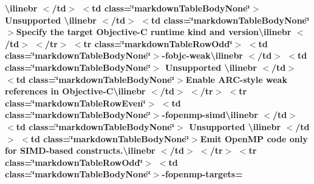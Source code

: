 \begin{longtabu}
{\bfseries{{\ttfamily \textbackslash{}ilinebr \texorpdfstring{$<$}{<}/td\texorpdfstring{$>$}{>} \texorpdfstring{$<$}{<}td class=\char`\"{}markdown\+Table\+Body\+None\char`\"{}\texorpdfstring{$>$}{>} Unsupported \textbackslash{}ilinebr \texorpdfstring{$<$}{<}/td\texorpdfstring{$>$}{>} \texorpdfstring{$<$}{<}td class=\char`\"{}markdown\+Table\+Body\+None\char`\"{}\texorpdfstring{$>$}{>}}Specify the target Objective-\/C runtime kind and version{\ttfamily \textbackslash{}ilinebr \texorpdfstring{$<$}{<}/td\texorpdfstring{$>$}{>} \texorpdfstring{$<$}{<}/tr\texorpdfstring{$>$}{>} \texorpdfstring{$<$}{<}tr class=\char`\"{}markdown\+Table\+Row\+Odd\char`\"{}\texorpdfstring{$>$}{>} \texorpdfstring{$<$}{<}td class=\char`\"{}markdown\+Table\+Body\+None\char`\"{}\texorpdfstring{$>$}{>}}-\/fobjc-\/weak{\ttfamily \textbackslash{}ilinebr \texorpdfstring{$<$}{<}/td\texorpdfstring{$>$}{>} \texorpdfstring{$<$}{<}td class=\char`\"{}markdown\+Table\+Body\+None\char`\"{}\texorpdfstring{$>$}{>} Unsupported \textbackslash{}ilinebr \texorpdfstring{$<$}{<}/td\texorpdfstring{$>$}{>} \texorpdfstring{$<$}{<}td class=\char`\"{}markdown\+Table\+Body\+None\char`\"{}\texorpdfstring{$>$}{>}}Enable ARC-\/style weak references in Objective-\/C{\ttfamily \textbackslash{}ilinebr \texorpdfstring{$<$}{<}/td\texorpdfstring{$>$}{>} \texorpdfstring{$<$}{<}/tr\texorpdfstring{$>$}{>} \texorpdfstring{$<$}{<}tr class=\char`\"{}markdown\+Table\+Row\+Even\char`\"{}\texorpdfstring{$>$}{>} \texorpdfstring{$<$}{<}td class=\char`\"{}markdown\+Table\+Body\+None\char`\"{}\texorpdfstring{$>$}{>}}-\/fopenmp-\/simd{\ttfamily \textbackslash{}ilinebr \texorpdfstring{$<$}{<}/td\texorpdfstring{$>$}{>} \texorpdfstring{$<$}{<}td class=\char`\"{}markdown\+Table\+Body\+None\char`\"{}\texorpdfstring{$>$}{>} Unsupported \textbackslash{}ilinebr \texorpdfstring{$<$}{<}/td\texorpdfstring{$>$}{>} \texorpdfstring{$<$}{<}td class=\char`\"{}markdown\+Table\+Body\+None\char`\"{}\texorpdfstring{$>$}{>}}Emit Open\+MP code only for SIMD-\/based constructs.{\ttfamily \textbackslash{}ilinebr \texorpdfstring{$<$}{<}/td\texorpdfstring{$>$}{>} \texorpdfstring{$<$}{<}/tr\texorpdfstring{$>$}{>} \texorpdfstring{$<$}{<}tr class=\char`\"{}markdown\+Table\+Row\+Odd\char`\"{}\texorpdfstring{$>$}{>} \texorpdfstring{$<$}{<}td class=\char`\"{}markdown\+Table\+Body\+None\char`\"{}\texorpdfstring{$>$}{>}}-\/fopenmp-\/targets=}}


\end{longtabu}
